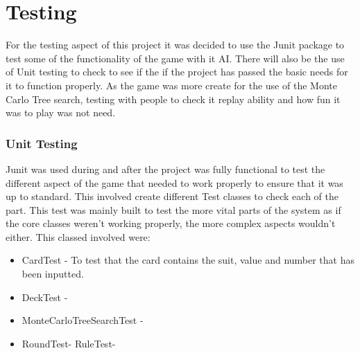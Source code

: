 \chapter{Testing}
For the testing aspect of this project it was decided to use the Junit package to test some of the functionality of the game with it AI. There will also be the use of Unit testing to check to see if the if the project has passed the basic needs for it to function properly. As the game was more create for the use of the Monte Carlo Tree search, testing with people to check it replay ability and how fun it was to play was not need.
\subsection{Unit Testing}
Junit was used during and after the project was fully functional to test the different aspect of the game that needed to work properly to ensure that it was up to standard. This involved create different Test classes to check each of the part. This test was mainly built to test the more vital parts of the system as if the core classes weren’t working properly, the more complex aspects wouldn’t either. This classed involved were:
\begin{itemize}
\item CardTest - To test that the card contains the suit, value and number that has been inputted.
\item DeckTest -
\item MonteCarloTreeSearchTest -
\item RoundTest-
\Item RuleTest-
\end{itemize}
